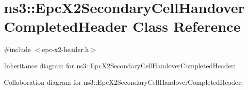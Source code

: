 \hypertarget{classns3_1_1EpcX2SecondaryCellHandoverCompletedHeader}{}\section{ns3\+:\+:Epc\+X2\+Secondary\+Cell\+Handover\+Completed\+Header Class Reference}
\label{classns3_1_1EpcX2SecondaryCellHandoverCompletedHeader}


{\ttfamily \#include $<$epc-\/x2-\/header.\+h$>$}



Inheritance diagram for ns3\+:\+:Epc\+X2\+Secondary\+Cell\+Handover\+Completed\+Header\+:


Collaboration diagram for ns3\+:\+:Epc\+X2\+Secondary\+Cell\+Handover\+Completed\+Header\+:
